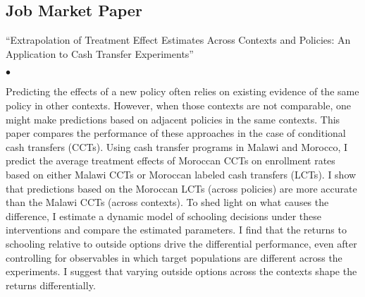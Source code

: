 \documentclass[margin,line]{res}
\newenvironment{list1}{
  \begin{list}{\ding{113}}{%
      \setlength{\itemsep}{.025in}
      \setlength{\parsep}{0in} \setlength{\parskip}{0in}
      \setlength{\topsep}{0in} \setlength{\partopsep}{0in}
      \setlength{\leftmargin}{0.17in}}}{\end{list}}
\newenvironment{list2}{
  \begin{list}{$\bullet$}{%
      \setlength{\itemsep}{0in}
      \setlength{\parsep}{0in} \setlength{\parskip}{0in}
      \setlength{\topsep}{0in} \setlength{\partopsep}{0in}
      \setlength{\leftmargin}{0.2in}}}{\end{list}}
\begin{document}
\begin{resume}
\section{Job Market Paper}
\begin{list1}
\item[] ``Extrapolation of Treatment Effect Estimates Across Contexts and Policies: An Application to Cash Transfer Experiments''
\begin{list2}
\item[] Predicting the effects of a new policy often relies on existing evidence of the same policy in other contexts. However, when those contexts are not comparable, one might make predictions based on adjacent policies in the same contexts. This paper compares the performance of these approaches in the case of conditional cash transfers (CCTs). Using cash transfer programs in Malawi and Morocco, I predict the average treatment effects of Moroccan CCTs on enrollment rates based on either Malawi CCTs or Moroccan labeled cash transfers (LCTs). I show that predictions based on the Moroccan LCTs (across policies) are more accurate than the Malawi CCTs (across contexts). To shed light on what causes the difference, I estimate a dynamic model of schooling decisions under these interventions and compare the estimated parameters. I find that the returns to schooling relative to outside options drive the differential performance, even after controlling for observables in which target populations are different across the experiments. I suggest that varying outside options across the contexts shape the returns differentially.
	\end{list2}
\end{list1}



\end{resume}
\end{document}
